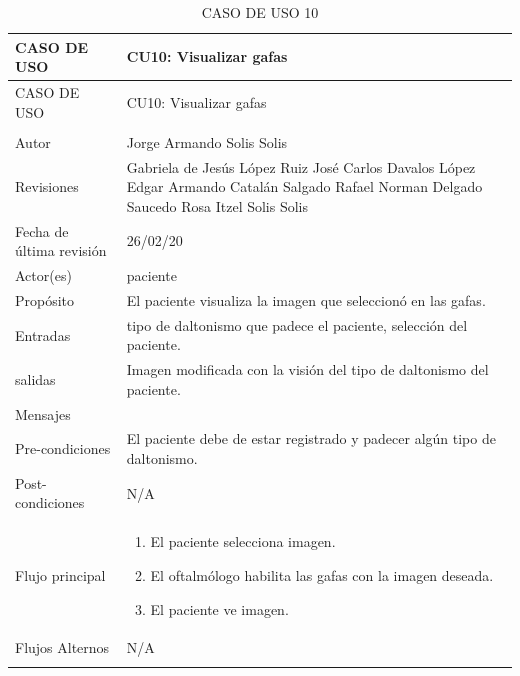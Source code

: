 \documentclass[10pt]{article}
\begin{document}
\begin{longtable}{|p{3.8cm}|p{10.8cm}|}
\hline
CASO DE USO & CU10: Visualizar gafas\\
\hline 
\endfirsthead

\hline

CASO DE USO & CU10: Visualizar gafas\\
\hline 
\endhead

\multicolumn{2}{c}{}
\endfoot

\endlastfoot
\hline
versión & 1\\
\hline
Autor & Jorge Armando Solis Solis\\
\hline
Revisiones & Gabriela de Jesús López Ruiz\newline
José Carlos Davalos López\newline
Edgar Armando Catalán Salgado\newline
Rafael Norman Delgado Saucedo\newline
Rosa Itzel Solis Solis
\\

\hline
Fecha de última revisión & 26/02/20\\
\hline
Actor(es) & paciente \\
\hline
Propósito & El paciente visualiza la imagen que seleccionó en las gafas.\\
\hline
Entradas & tipo de daltonismo que padece el paciente, selección del paciente.\\
\hline
salidas & Imagen modificada con la visión del tipo de daltonismo del paciente.\\
\hline
Mensajes & \\
\hline
Pre-condiciones & El paciente debe de estar registrado y padecer algún tipo de daltonismo.\\
\hline
Post-condiciones & N/A\\
\hline
Flujo principal & \begin{enumerate}
    \item El paciente selecciona imagen.
    \item El oftalmólogo habilita las gafas con la imagen deseada.
    \item El paciente ve imagen.
\end{enumerate}
    \\
\hline
Flujos Alternos & 
    N/A\\
\hline
\caption{CASO DE USO 10}
\label{tabla1}
\end{longtable}
\end{document}
